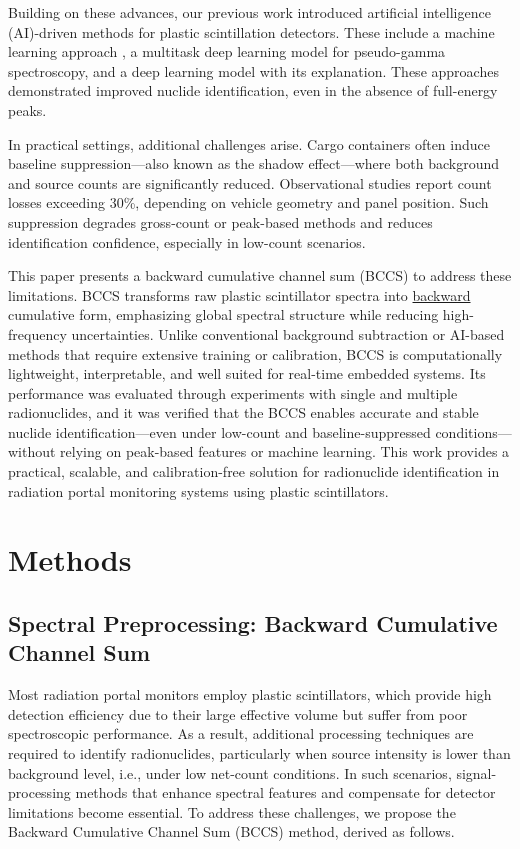 \documentclass[10pt]{wlscirep}
\begin{document}
Building on these advances, our previous work introduced artificial intelligence (AI)-driven methods for plastic scintillation detectors. These include a machine learning approach \cite{Jeon2021CompML}, a multitask deep learning model for pseudo-gamma spectroscopy\cite{Jeon2021PseudoGamma}, and a deep learning model with its explanation\cite{Jeon2023Explanation}. These approaches demonstrated improved nuclide identification, even in the absence of full-energy peaks. 

In practical settings, additional challenges arise. Cargo containers often induce baseline suppression—also known as the shadow effect—where both background and source counts are significantly reduced. Observational studies report count losses exceeding 30\%, depending on vehicle geometry and panel position\cite{LoPresti2006BaselineSuppression}. Such suppression degrades gross-count or peak-based methods and reduces identification confidence, especially in low-count scenarios. 

This paper presents a backward cumulative channel sum (BCCS) to address these limitations. BCCS transforms raw plastic scintillator spectra into \ul{backward} cumulative form, emphasizing global spectral structure while reducing high-frequency uncertainties. Unlike conventional background subtraction or AI-based methods that require extensive training or calibration, BCCS is computationally lightweight, interpretable, and well suited for real-time embedded systems. Its performance was evaluated through experiments with single and multiple radionuclides, and it was verified that the BCCS enables accurate and stable nuclide identification—even under low-count and baseline-suppressed conditions—without relying on peak-based features or machine learning. This work provides a practical, scalable, and calibration-free solution for radionuclide identification in radiation portal monitoring systems using plastic scintillators.

\section*{Methods}

\subsection*{Spectral Preprocessing: Backward Cumulative Channel Sum}

Most radiation portal monitors employ plastic scintillators, which provide high detection efficiency due to their large effective volume but suffer from poor spectroscopic performance. As a result, additional processing techniques are required to identify radionuclides, particularly when source intensity is lower than background level, i.e., under low net-count conditions. In such scenarios, signal-processing methods that enhance spectral features and compensate for detector limitations become essential. To address these challenges, we propose the Backward Cumulative Channel Sum (BCCS) method, derived as follows.
\end{document}
